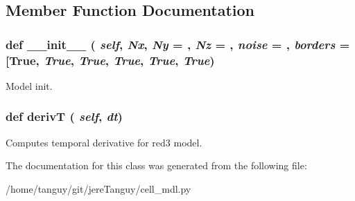 \subsection{Member Function Documentation}
\hypertarget{classcell__mdl_1_1_red3_ac775ee34451fdfa742b318538164070e}{
\subsubsection[{\_\-\_\-init\_\-\_\-}]{\setlength{\rightskip}{0pt plus 5cm}def \_\-\_\-init\_\-\_\- ( {\em self}, \/   {\em Nx}, \/   {\em Ny} = {}, \/   {\em Nz} = {}, \/   {\em noise} = {}, \/   {\em borders} = {\ttfamily \mbox{[}True}, \/   {\em True}, \/   {\em True}, \/   {\em True}, \/   {\em True}, \/   {\em True})}}
\label{classcell__mdl_1_1_red3_ac775ee34451fdfa742b318538164070e}
\begin{DoxyVerb}Model init.\end{DoxyVerb}
 \hypertarget{classcell__mdl_1_1_red3_ad67701a6bb599a16a9eb386aa1cd4328}{
\subsubsection[{derivT}]{\setlength{\rightskip}{0pt plus 5cm}def derivT ( {\em self}, \/   {\em dt})}}
\label{classcell__mdl_1_1_red3_ad67701a6bb599a16a9eb386aa1cd4328}
\begin{DoxyVerb}Computes temporal derivative for red3 model.\end{DoxyVerb}
 

The documentation for this class was generated from the following file:\begin{DoxyCompactItemize}
\item 
/home/tanguy/git/jereTanguy/cell\_\-mdl.py\end{DoxyCompactItemize}
